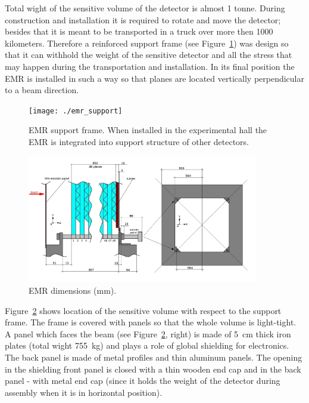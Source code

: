\documentclass[a4paper,11pt]{article}
\begin{document}
Total wight of the sensitive volume of the detector is almost 1 tonne. During construction and installation it is required to rotate and move the detector;
besides that it is meant to be transported in a truck over more then 1000 kilometers. Therefore a reinforced support frame (see Figure~\ref{fig:emr_support})
was design so that it can withhold the weight of the sensitive detector and all the stress that may happen during the transportation and installation. In its
final position the EMR is installed in such a way so that planes are located vertically perpendicular to a beam direction. 

\begin{figure}[htp!]
 \centering 
 \texttt{[image: ./emr\_support]}
 \caption[EMR support frame]{EMR support frame. When installed in the experimental hall the EMR is integrated into support structure of other detectors.}
 \label{fig:emr_support}
\end{figure}

\begin{figure}[htp!]
 \centering
 \includegraphics[width=0.9\textwidth]{./internal_dimensions}
 \caption[EMR dimensions]{EMR dimensions (mm).}
 \label{fig:internal_dimensions}
\end{figure}

Figure~\ref{fig:internal_dimensions} shows location of the sensitive volume with respect to the support frame. The frame is covered with panels so that the
whole volume is light-tight. A panel which faces the beam (see Figure~\ref{fig:internal_dimensions}, right) is made of 5~cm thick iron plates (total wight
755~kg) and plays a role of global shielding for electronics. The back panel is made of metal profiles and thin aluminum panels. The opening in the shielding
front panel is closed with a thin wooden end cap and in the back panel - with metal end cap (since it holds the weight of the detector during assembly when
it is in horizontal position).
\end{document}
